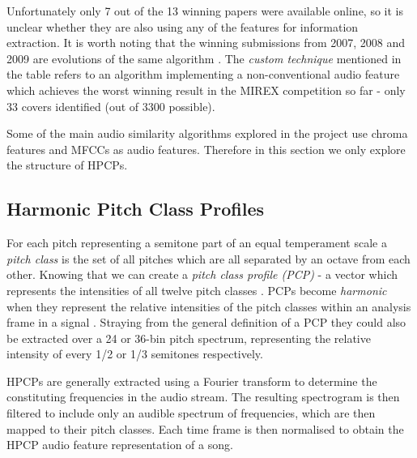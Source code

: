 Unfortunately only 7 out of the 13 winning papers were available online, so it
is unclear whether they are also using any of the features for information
extraction. It is worth noting that the winning submissions from 2007, 2008 and
2009 are evolutions of the same algorithm \cite{serra2007cover}
\cite{serra2008improving} \cite{serra2009cover}. The \textit{custom technique}
mentioned in the table refers to an algorithm implementing a non-conventional
audio feature which achieves the worst winning result in the MIREX competition
so far  -  only  33  covers  identified  (out  of  3300 possible).

Some of the main audio similarity algorithms explored in the project use chroma
features and MFCCs as audio features. Therefore in this section we only explore
the structure of HPCPs.

\subsection{Harmonic Pitch Class Profiles}
\label{subsec:hpcp}

For each pitch representing a semitone part of an equal temperament scale a
\textit{pitch class} is the set of all pitches which are all separated by an
octave from each other. Knowing that we can create a \textit{pitch class profile
(PCP)} - a vector which represents the intensities of all twelve pitch classes
\cite{fujishima1999real}. PCPs become \textit{harmonic} when they represent the
relative intensities of the pitch classes within an analysis frame in a signal
\cite{wiki:hpcp}. Straying from the general definition of a PCP they could also
be extracted over a 24 or 36-bin pitch spectrum, representing the relative
intensity of every 1/2 or 1/3 semitones respectively.

HPCPs are generally extracted using a Fourier transform to determine the
constituting frequencies in the audio stream. The resulting spectrogram is then
filtered to include only an audible spectrum of frequencies, which are then
mapped to their pitch classes. Each time frame is then normalised to obtain the
HPCP audio feature representation of a song.